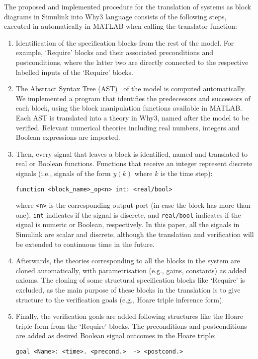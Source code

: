 \documentclass[a4paper]{article}
\begin{document}
The proposed and implemented procedure for the translation of systems as block diagrams in Simulink into Why3 language consists of the following steps, executed in automatically in MATLAB when calling the translator function:
\begin{enumerate}
\item  Identification of the specification blocks from the rest of the model. For example, `Require' blocks and their associated preconditions and postconditions, where the latter two are directly connected to the respective labelled inputs of the `Require' blocks. 

\item The Abstract Syntax Tree (AST)~\cite{PVS,Simcheck} of the model is computed automatically. We implemented a program that identifies the predecessors and successors of each block, using the block manipulation functions available in MATLAB. Each AST is translated into a theory in Why3, named after the model to be verified. Relevant numerical theories including real numbers, integers and Boolean expressions are imported. 

\item Then, every signal that leaves a block is identified, named and translated to real or Boolean functions. Functions that receive an integer represent discrete signals (i.e., signals of the form $y(k)$ where $k$ is the time step): 


\begin{verbatim}
function <block_name>_op<n> int: <real/bool>
\end{verbatim}
where \verb+<n>+ is the corresponding output port (in case the block has more than one), \verb+int+ indicates if the signal is discrete, and \verb+real/bool+ indicates if the signal is numeric or Boolean, respectively. In this paper, all the signals in Simulink are scalar and discrete, although the translation and verification will be extended to continuous time in the future. 

\item Afterwards, the theories corresponding to all the blocks in the system are cloned automatically, with parametrisation (e.g., gains, constants) as added axioms. The cloning of some structural specification blocks like `Require' is excluded, as the main purpose of these blocks in the translation is to give structure to the verification goals (e.g., Hoare triple inference form).  

\item Finally, the verification goals are added following structures like the Hoare triple form from the `Require' blocks. The preconditions and postconditions are added as desired Boolean signal outcomes in the Hoare triple: 

\begin{verbatim}
goal <Name>: <time>. <precond.>  -> <postcond.>
\end{verbatim}
\end{enumerate}
\end{document}
